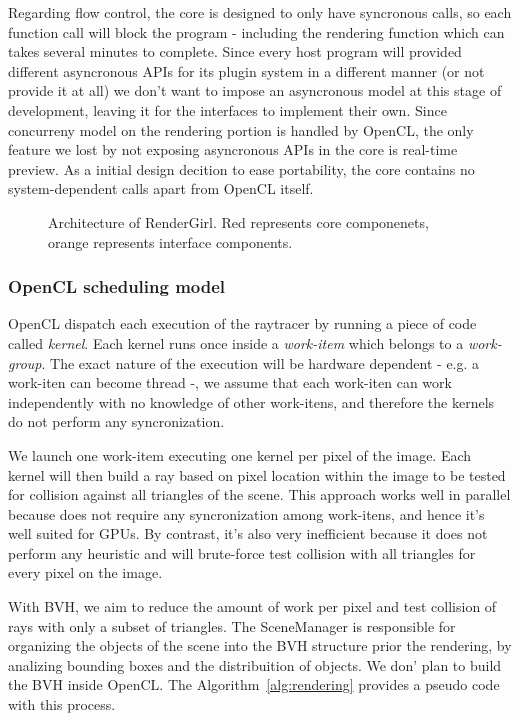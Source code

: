 \documentclass[a4paper]{sbgames}               %
\begin{document}
Regarding flow control, the core is designed to only have syncronous
calls, so each function call will block the program - including the
rendering function which can takes several minutes to complete. Since
every host program will provided different asyncronous APIs for its
plugin system in a different manner (or not provide it at all) we
don't want to impose an asyncronous model at this stage of
development, leaving it for the interfaces to implement their
own. Since concurreny model on the rendering portion is handled by
OpenCL, the only feature we lost by not exposing asyncronous APIs in
the core is real-time preview. As a initial design decition to ease
portability, the core contains no system-dependent calls apart from
OpenCL itself.

\begin{figure}
\centering

\caption{Architecture of RenderGirl. Red represents core componenets,
  orange represents interface components.}
\label{fig:architecture}
\end{figure}

\subsubsection{OpenCL scheduling model}

OpenCL dispatch each execution of the raytracer by running a piece of
code called \emph{kernel}. Each kernel runs once inside a
\emph{work-item} which belongs to a \emph{work-group}. The exact
nature of the execution will be hardware dependent - e.g. a work-iten
can become thread -, we assume that each work-iten can work
independently with no knowledge of other work-itens, and therefore the
kernels do not perform any syncronization.

We launch one work-item executing one kernel per pixel of the
image. Each kernel will then build a ray based on pixel location
within the image to be tested for collision against all triangles of
the scene. This approach works well in parallel because does not
require any syncronization among work-itens, and hence it's well
suited for GPUs. By contrast, it's also very inefficient because it
does not perform any heuristic and will brute-force test collision
with all triangles for every pixel on the image.

With BVH, we aim to reduce the amount of work per pixel and test
collision of rays with only a subset of triangles. The SceneManager is
responsible for organizing the objects of the scene into the BVH
structure prior the rendering, by analizing bounding boxes and the
distribuition of objects. We don' plan to build the BVH inside
OpenCL. The Algorithm~\ref{alg:rendering} provides a pseudo code
with this process.
\end{document}
